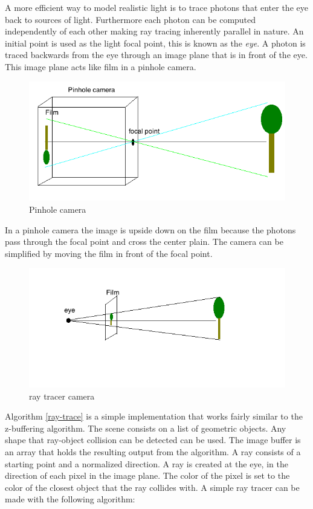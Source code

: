 \documentclass[12pt,a4paper,oneside]{article}
\begin{document}
A more efficient way to model realistic light is to trace photons that enter the eye back to sources of light.  Furthermore each photon can be computed independently of each other making ray tracing inherently parallel in nature.  An initial point is used as the light focal point, this is known as the \textit{eye}.  A photon is traced backwards from the eye through an image plane that is in front of the eye.  This image plane acts like film in a pinhole camera.  

\begin{figure}[H]
\includegraphics[scale=0.6]{pineholecamera.png} 
\caption{Pinhole camera}
\label{pinhole-camera}
\end{figure}

In a pinhole camera the image is upside down on the film because the photons pass through the focal point and cross the center plain.  The camera can be simplified by moving the film in front of the focal point.

 \begin{figure}[H]
\includegraphics[scale=0.6]{raycamera.png} 
\caption{ray tracer camera}
\label{ray-camera}
\end{figure}

Algorithm \ref{ray-trace} is a simple implementation that works fairly similar to the z-buffering algorithm.  The scene consists on a list of geometric  objects.  Any shape that ray-object collision can be detected can be used.  The image buffer is an array that holds the resulting output from the algorithm.  A ray consists of a starting point and a normalized direction.  A ray is created at the eye, in the direction of each pixel in the image plane.  The color of the pixel is set to the color of the closest object that the ray collides with.  A simple ray tracer can be made with the following algorithm:
\end{document}

